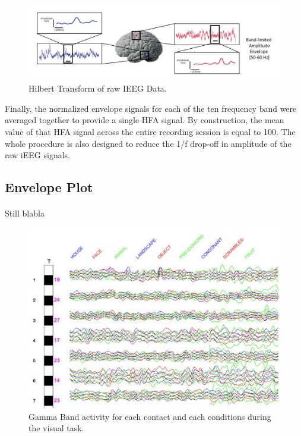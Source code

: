\documentclass[a4paper]{article}
\begin{document}
\begin{figure}[H]
\begin{center}
\includegraphics[scale=0.4]{HilbertProcessing.png}
\end{center}
\caption{\label{HilbertProcessingPicture}Hilbert Transform of raw IEEG Data.}
\end{figure}

Finally, the normalized envelope signals for each of the ten frequency band were averaged together to provide a single HFA signal. By construction, the mean value of that HFA signal across the entire recording session is equal to 100. The whole procedure is also designed to reduce the 1/f drop‐off in amplitude of the raw iEEG signals. 

\subsection{Envelope Plot}
\paragraph{} Still blabla
\begin{figure}[H]
\begin{center}
\includegraphics[scale=0.8]{EnvelopePlots.png}
\end{center}
\caption{\label{EnvelopePlotsPicture}Gamma Band activity for each contact and each conditions during the visual task.}
\end{figure}
\end{document}
